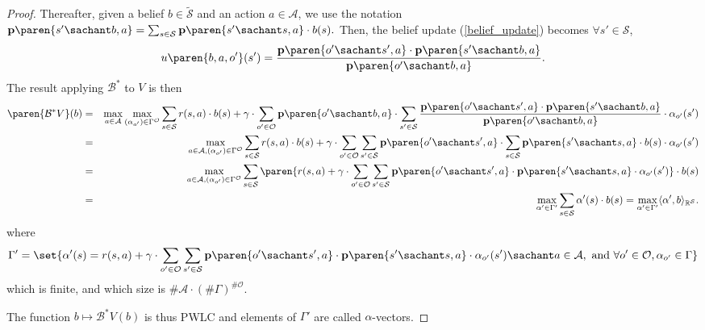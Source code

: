 \begin{proof}
Thereafter, given a belief $b \in \tilde{\mathcal{S}}$
and an action $a \in \mathcal{A}$, 
we use the notation $\textbf{p} \paren{ s' \sachant b,a } = \sum_{s \in \mathcal{S}} \textbf{p} \paren{ s' \sachant s, a } \cdot b(s).$
Then, the belief update (\ref{belief_update}) becomes
$\forall s' \in \mathcal{S}$,
\[ u \paren{b,a,o'}(s') =  \dfrac{ \textbf{p} \paren{o' \sachant s',a} \cdot \textbf{p} \paren{ s' \sachant b ,a } }{ \textbf{p} \paren{ o' \sachant b,a}}.  \]
The result applying $\mathcal{B}^*$ to $V$ is then
\begin{eqnarray*}
\paren{\mathcal{B}^* V}(b) & = & \max_{a \in \mathcal{A}} \max_{(\alpha_{o'}) \in \Gamma^{\mathcal{O}} } \sum_{s \in \mathcal{S}} r(s,a) \cdot b(s) + \gamma \cdot \sum_{o' \in \mathcal{O}} \textbf{p} \paren{o' \sachant b, a} \cdot \sum_{s' \in \mathcal{S}} \dfrac{ \textbf{p} \paren{o' \sachant s',a} \cdot \textbf{p} \paren{ s' \sachant b ,a } }{ \textbf{p} \paren{ o' \sachant b,a}} \cdot \alpha_{o'}(s') \\
& = & \max_{a \in \mathcal{A},(\alpha_{o'}) \in \Gamma^{\mathcal{O}}}  \sum_{s \in \mathcal{S}} r(s,a) \cdot b(s) + \gamma \cdot \sum_{o' \in \mathcal{O}} \sum_{s' \in \mathcal{S}} \textbf{p} \paren{o' \sachant s',a} \cdot \sum_{s \in \mathcal{S}} \textbf{p} \paren{ s' \sachant s ,a  } \cdot b(s) \cdot \alpha_{o'}(s') \\
& = & \max_{a \in \mathcal{A},(\alpha_{o'}) \in \Gamma^{\mathcal{O}}}  \sum_{s \in \mathcal{S}} \paren{ r(s,a) + \gamma \cdot \sum_{o' \in \mathcal{O}} \sum_{s' \in \mathcal{S}} \textbf{p} \paren{o' \sachant s',a} \cdot \textbf{p} \paren{ s' \sachant s ,a  } \cdot \alpha_{o'}(s') } \cdot b(s) \\
& = & \max_{\alpha' \in \Gamma'}  \sum_{s \in \mathcal{S}} \alpha'(s) \cdot b(s) = \max_{\alpha' \in \Gamma'} \langle \alpha', b \rangle_{\mathbb{R}^{\mathcal{S}}}.
\end{eqnarray*}
where
\[\Gamma' = \set{ \alpha'(s) = r(s,a) + \gamma \cdot \displaystyle \sum_{o' \in \mathcal{O}} \sum_{s' \in \mathcal{S}} \textbf{p} \paren{o' \sachant s',a} \cdot \textbf{p} \paren{ s' \sachant s ,a  } \cdot \alpha_{o'}(s') \sachant a \in \mathcal{A}, \mbox{ and } \forall o' \in \mathcal{O}, \alpha_{o'} \in \Gamma }\]
which is finite, and which size is $\# \mathcal{A} \cdot (\# \Gamma)^{ \# \mathcal{O} }$.

The function $b \mapsto \mathcal{B}^* V(b)$ is thus PWLC 
and elements of $\Gamma'$ are called $\alpha$-vectors. 
\end{proof}














